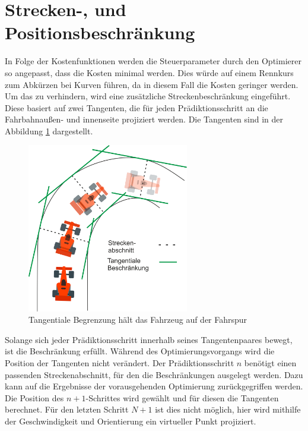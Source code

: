 \documentclass{like}
\begin{document}
\section{Strecken-, und Positionsbeschränkung}
\label{trackAndPosConstraint}
In Folge der Kostenfunktionen werden die Steuerparameter durch den Optimierer so angepasst, dass die Kosten minimal werden. Dies würde auf einem Rennkurs zum Abkürzen bei Kurven führen, da in diesem Fall die Kosten geringer werden. Um das zu verhindern, wird eine zusätzliche Streckenbeschränkung eingeführt. Diese basiert auf zwei Tangenten, die für jeden Prädiktionsschritt an die Fahrbahnaußen- und innenseite projiziert werden. Die Tangenten sind in der Abbildung \ref{fig:tangentialConstraint} dargestellt.
\begin{figure}[ht!]
	\centering
	\includegraphics[width=200pt]{Abbildungen/tangentialConstraint.png}
	\caption{Tangentiale Begrenzung hält das Fahrzeug auf der Fahrspur}
	\label{fig:tangentialConstraint}
\end{figure}

Solange sich jeder Prädiktionsschritt innerhalb seines Tangentenpaares bewegt, ist die Beschränkung erfüllt. Während des Optimierungsvorgangs wird die Position der Tangenten nicht verändert. Der Prädiktionsschritt \(n\) benötigt einen passenden Streckenabschnitt, für den die Beschränkungen ausgelegt werden. Dazu kann auf die Ergebnisse der vorausgehenden Optimierung zurückgegriffen werden. Die Position des $n+1$-Schrittes wird gewählt und für diesen die Tangenten berechnet. Für den letzten Schritt \(N +1\) ist dies nicht möglich, hier wird mithilfe der Geschwindigkeit und Orientierung ein virtueller Punkt projiziert.   
\end{document}
